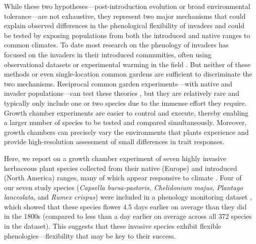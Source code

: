 \documentclass[11pt]{article}\usepackage[]{graphicx}\usepackage[]{color}
\begin{document}
While these two hypotheses---post-introduction evolution or broad environmental tolerance---are not exhaustive, they represent two major mechanisms that could explain observed differences in the phenological flexibility of invaders \parencite{Wolkovich2014,Reeb2020,Zettlemoyer2019} and could be tested by exposing populations from both the introduced and native ranges to common climates. To date most research on the phenology of invaders has focused on the invaders in their introduced communities, often using observational datasets \parencite[e.g.,][]{Wolkovich2013} or experimental warming in the field \parencite[e.g.,][]{Zettlemoyer2019}. But neither of these methods or even single-location common gardens \parencite[i.e., testing individuals from only one part of the range or in only one site,][]{Conner2004,Vitasse2009} are sufficient to discriminate the two mechanisms. Reciprocal common garden experiments---with native and invader populations---can test these theories \parencite[e.g.,][]{Williams2008,Lamarque2015}, but they are relatively rare and typically only include one or two species due to the immense effort they require. Growth chamber experiments are easier to control and execute, thereby enabling a larger number of species to be tested and compared simultaneously. Moreover, growth chambers can precisely vary the environments that plants experience and provide high-resolution assessment of small differences in trait responses. 

Here, we report on a growth chamber experiment of seven highly invasive herbaceous plant species collected from their native (Europe) and introduced (North America) ranges, many of which appear responsive to climate \parencite{Wolkovich2014}. Four of our seven study species (\textit{Capsella bursa-pastoris, Chelidonium majus, Plantago lanceolata}, and \textit{Rumex crispus}) were included in a phenology monitoring dataset \parencite[the Concord Phenology Dataset,][]{Willis:2008bf}, which showed that these species flower 4.5 days earlier on average than they did in the 1800s (compared to less than a day earlier on average across all 372 species in the dataset). This suggests that these invasive species exhibit flexible phenologies---flexibility that may be key to their success. %
\end{document}
